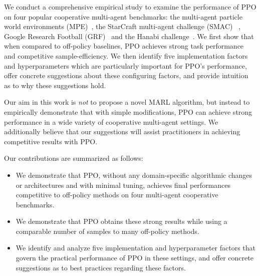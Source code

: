 \documentclass{article}
\theoremstyle{plain}
\theoremstyle{definition}
\theoremstyle{remark}
\begin{document}
We conduct a comprehensive empirical study to examine the performance of PPO on four popular cooperative multi-agent benchmarks: the multi-agent particle world environments (MPE)~\citep{lowe2017multi}, the StarCraft multi-agent challenge (SMAC) ~\citep{starcraft}, Google Research Football (GRF)~\cite{kurach2020google} and the Hanabi challenge~\citep{bard2020hanabi}. We first show that when compared to off-policy baselines, PPO achieves strong task performance and competitive sample-efficiency. We then identify five implementation factors and hyperparameters which are particularly important for PPO's performance, offer concrete suggestions about these configuring factors, and provide intuition as to why these suggestions hold. 

Our aim in this work is \emph{not} to propose a novel MARL algorithm, but instead to empirically demonstrate that with simple modifications, PPO can achieve strong performance in a wide variety of cooperative multi-agent settings. We additionally believe that our suggestions will assist practitioners in achieving competitive results with PPO.


Our contributions are summarized as follows: 
\vspace{-\topsep}
\begin{itemize}
    \setlength{\parskip}{0pt} \setlength{\itemsep}{0pt plus 1pt}
    \item We demonstrate that PPO, without any domain-specific algorithmic changes or architectures and with minimal tuning, achieves final performances competitive to off-policy methods on four multi-agent cooperative benchmarks. 
    \item We demonstrate that PPO obtains these strong results while using a comparable number of samples to many off-policy methods. 
    \item We identify and analyze five implementation and hyperparameter factors that govern the practical performance of PPO in these settings, and offer concrete suggestions as to best practices regarding these factors. 
\end{itemize} 
\vspace{-\topsep}
\end{document}
